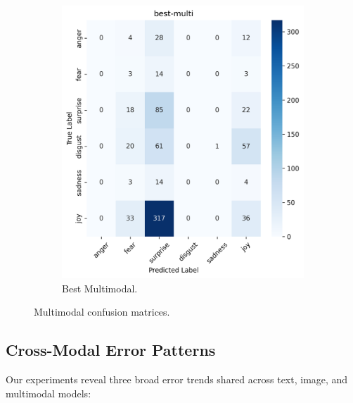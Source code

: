 \begin{figure}[h]
\begin{subfigure}[b]{0.48\textwidth}
        \includegraphics[width=\textwidth]{images/confusion_matrix_best_multi_dist.png}
        \caption{Best Multimodal.}
        \label{fig:multi-confusion-best}
    \end{subfigure}
    \caption{Multimodal confusion matrices.}
    \label{fig:multi-confusion}
\end{figure}

\subsection{Cross-Modal Error Patterns}
\label{subsec:cross-modal}

Our experiments reveal three broad error trends shared across text, image, and multimodal models:

